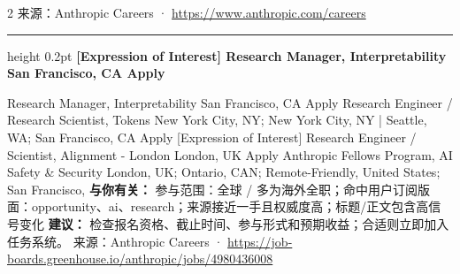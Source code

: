 \documentclass[10.5pt]{ctexart}
\begin{document}
\begin{multicols}{2}
{\footnotesize\color{ormuted} 来源：Anthropic Careers · \url{https://www.anthropic.com/careers}}
\vspace{2mm}
\hrule height 0.2pt
\vspace{2mm}
{\large\bfseries [Expression of Interest] Research Manager, Interpretability San Francisco, CA Apply}\par
[Expression of Interest] Research Manager, Interpretability San Francisco, CA Apply Research Engineer / Research Scientist, Tokens New York City, NY; New York City, NY | Seattle, WA; San Francisco, CA Apply [Expression of Interest] Research Engineer / Scientist, Alignment - London London, UK Apply Anthropic Fellows Program, AI Safety \& Security London, UK; Ontario, CAN; Remote-Friendly, United States; San Francisco, 
\textbf{与你有关：} 参与范围：全球 / 多为海外全职；命中用户订阅版面：opportunity、ai、research；来源接近一手且权威度高；标题/正文包含高信号变化
\textbf{建议：} 检查报名资格、截止时间、参与形式和预期收益；合适则立即加入任务系统。
{\footnotesize\color{ormuted} 来源：Anthropic Careers · \url{https://job-boards.greenhouse.io/anthropic/jobs/4980436008}}
\end{multicols}
\end{document}
